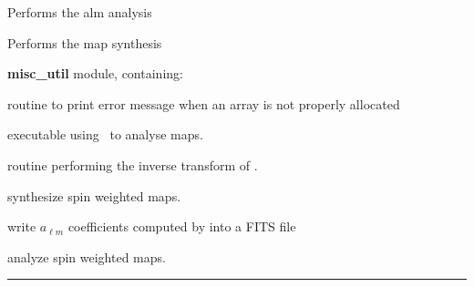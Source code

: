 \begin{modules}
  \begin{sulist}{} %
  \item[\htmlref{map2alm}{sub:map2alm}] Performs the alm analysis
  \item[\htmlref{alm2map}{sub:alm2map}] Performs the map synthesis
  \item[\textbf{misc\_util}] module, containing:
  \item[\htmlref{assert\_alloc}{sub:assert}] routine to print error message when an array is not
  properly allocated		
  \end{sulist}
\end{modules}

\begin{related}
  \begin{sulist}{} %
  \item[\htmlref{anafast}{fac:anafast}] executable using \thedocid \ to analyse maps.
  \item[\htmlref{alm2map}{sub:alm2map}] routine performing the inverse transform of \thedocid.
  \item[\htmlref{alm2map\_spin}{sub:alm2map_spin}] synthesize spin weighted
maps.
  \item[\htmlref{dump\_alms}{sub:dump_alms}] write $a_{\ell m}$ coefficients
computed by \thedocid into a FITS file
  \item[\htmlref{map2alm\_spin}{sub:map2alm_spin}] analyze spin weighted maps.
  \end{sulist}
\end{related}

\rule{\hsize}{2mm}

\newpage
